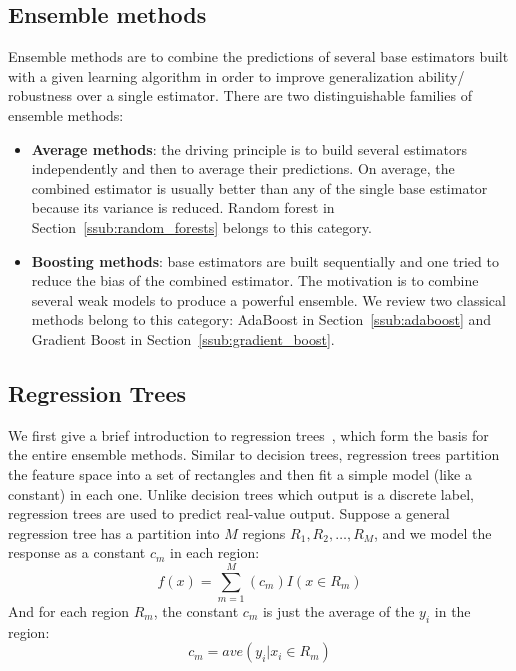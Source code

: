 \subsection{Ensemble methods}
\label{sub:ensemble_methods}
Ensemble methods are to combine the predictions of several base estimators built with a given learning algorithm in order to improve generalization ability/ robustness over a single estimator.
There are two distinguishable families of ensemble methods:
\begin{itemize}
	\item \textbf{Average methods}: the driving principle is to build several estimators independently and then to average their predictions. On average, the combined estimator is usually better than any of the single base estimator because its variance is reduced. Random forest in Section~\ref{ssub:random_forests} belongs to this category.
	\item \textbf{Boosting methods}: base estimators are built sequentially and one tried to reduce the bias of the combined estimator. The motivation is to combine several weak models to produce a powerful ensemble. We review two classical methods belong to this category: AdaBoost in Section~\ref{ssub:adaboost} and Gradient Boost in Section~\ref{ssub:gradient_boost}.
\end{itemize}

\subsection{Regression Trees}
\label{ssub:regression_tree}
We first give a brief introduction to regression trees~\cite{hastie2009elements}, which form the basis for the entire ensemble methods.
Similar to decision trees, regression trees partition the feature space into a set of rectangles and then fit a simple model (like a constant) in each one.
Unlike decision trees which output is a discrete label, regression trees are used to predict real-value output.
Suppose a general regression tree has a partition into $M$ regions $R_1, R_2, \ldots, R_M$, and we model the response as a constant $c_m$ in each region:
\begin{equation}
	f(x) = \sum \limits_{m=1}^{M} (c_m)I(x \in R_m)
\end{equation}
And for each region $R_m$, the constant $c_m$ is just the average of the $y_i$ in the region:
\begin{equation}
	c_m  = ave(y_i | x_i \in R_m)
\end{equation}

